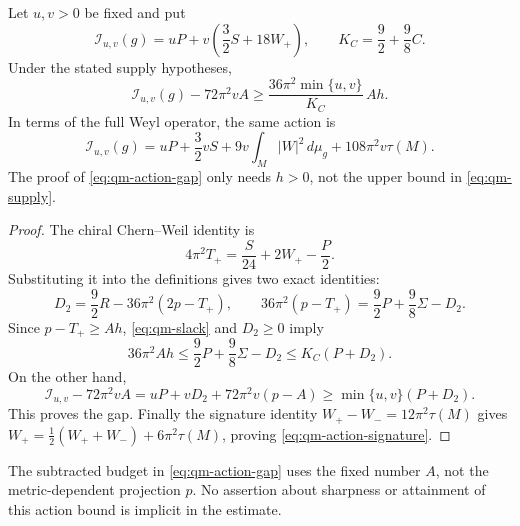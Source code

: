 \begin{proposition}
\label{prop:qm-action}
Let $u,v>0$ be fixed and put
\[
 \mathscr I_{u,v}(g)=uP+v\left(\frac32S+18W_+\right),
 \qquad K_C=\frac92+\frac98C.
\]
Under the stated supply hypotheses,
\begin{equation}\label{eq:qm-action-gap}
 \mathscr I_{u,v}(g)-72\pi^2vA
 \ge\frac{36\pi^2\min\{u,v\}}{K_C}\,Ah.
\end{equation}
In terms of the full Weyl operator, the same action is
\begin{equation}\label{eq:qm-action-signature}
 \mathscr I_{u,v}(g)
 =uP+\frac32vS+9v\int_M|W|^2\,d\mu_g+108\pi^2v\tau(M).
\end{equation}
The proof of \eqref{eq:qm-action-gap} only needs $h>0$, not the upper
bound in \eqref{eq:qm-supply}.
\end{proposition}

\begin{proof}
The chiral Chern--Weil identity is
\[
 4\pi^2T_+=\frac S{24}+2W_+-\frac P2.
\]
Substituting it into the definitions gives two exact identities:
\begin{equation}\label{eq:qm-exact-identities}
 D_2=\frac92R-36\pi^2(2p-T_+),\qquad
 36\pi^2(p-T_+)=\frac92P+\frac98\Sigma-D_2.
\end{equation}
Since $p-T_+\ge Ah$, \eqref{eq:qm-slack} and $D_2\ge0$ imply
\[
 36\pi^2Ah
 \le\frac92P+\frac98\Sigma-D_2
 \le K_C(P+D_2).
\]
On the other hand,
\[
 \mathscr I_{u,v}-72\pi^2vA
 =uP+vD_2+72\pi^2v(p-A)
 \ge\min\{u,v\}(P+D_2).
\]
This proves the gap.  Finally the signature identity
$W_+-W_-=12\pi^2\tau(M)$ gives
$W_+=\frac12(W_++W_-)+6\pi^2\tau(M)$, proving
\eqref{eq:qm-action-signature}.
\end{proof}

The subtracted budget in \eqref{eq:qm-action-gap} uses the fixed number
$A$, not the metric-dependent projection $p$.  No assertion about
sharpness or attainment of this action bound is implicit in the estimate.

